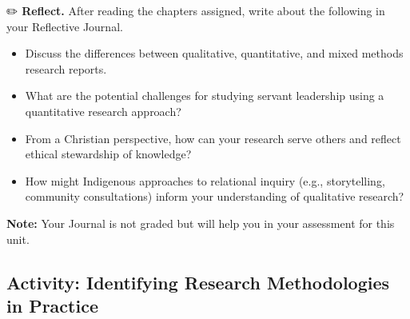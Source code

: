 \documentclass[
  letterpaper,
  DIV=11,
  numbers=noendperiod]{scrreprt}
\providecommand{\tightlist}{%
  \setlength{\itemsep}{0pt}\setlength{\parskip}{0pt}}\usepackage{longtable,booktabs,array}
\begin{document}
✏️ \textbf{Reflect.} After reading the chapters assigned, write about
the following in your Reflective Journal.

\begin{itemize}
\tightlist
\item
  Discuss the differences between qualitative, quantitative, and mixed
  methods research reports.
\item
  What are the potential challenges for studying servant leadership
  using a quantitative research approach?
\item
  From a Christian perspective, how can your research serve others and
  reflect ethical stewardship of knowledge?
\item
  How might Indigenous approaches to relational inquiry (e.g.,
  storytelling, community consultations) inform your understanding of
  qualitative research?
\end{itemize}

\textbf{Note:} Your Journal is not graded but will help you in your
assessment for this unit.

\subsection*{Activity: Identifying Research Methodologies in
Practice}\label{activity-identifying-research-methodologies-in-practice}
\end{document}
